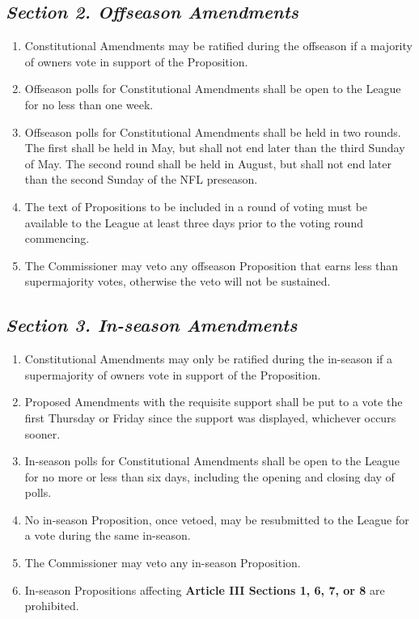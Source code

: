 \documentclass{article}
\begin{document}
    \subsection{\textit{Section 2. Offseason Amendments}}
    \begin{enumerate}[label=\Alph*)]
        \item Constitutional Amendments may be ratified during the offseason if a majority of owners vote in support of the Proposition.
        \item Offseason polls for Constitutional Amendments shall be open to the League for no less than one week.
        \item Offseason polls for Constitutional Amendments shall be held in two rounds. The first shall be held in May, but shall not end later than the third Sunday of May. The second round shall be held in August, but shall not end later than the second Sunday of the NFL preseason.
        \item The text of Propositions to be included in a round of voting must be available to the League at least three days prior to the voting round commencing.
        \item The Commissioner may veto any offseason Proposition that earns less than supermajority votes, otherwise the veto will not be sustained.
    \end{enumerate}
    \subsection{\textit{Section 3. In-season Amendments}}
    \begin{enumerate}[label=\Alph*)]
        \item Constitutional Amendments may only be ratified during the in-season if a supermajority of owners vote in support of the Proposition.
        \item Proposed Amendments with the requisite support shall be put to a vote the first Thursday or Friday since the support was displayed, whichever occurs sooner.
        \item In-season polls for Constitutional Amendments shall be open to the League for no more or less than six days, including the opening and closing day of polls.
        \item No in-season Proposition, once vetoed, may be resubmitted to the League for a vote during the same in-season.
        \item The Commissioner may veto any in-season Proposition.
        \item In-season Propositions affecting \textbf{Article III Sections 1, 6, 7, or 8} are prohibited.
    \end{enumerate}
\end{document}
